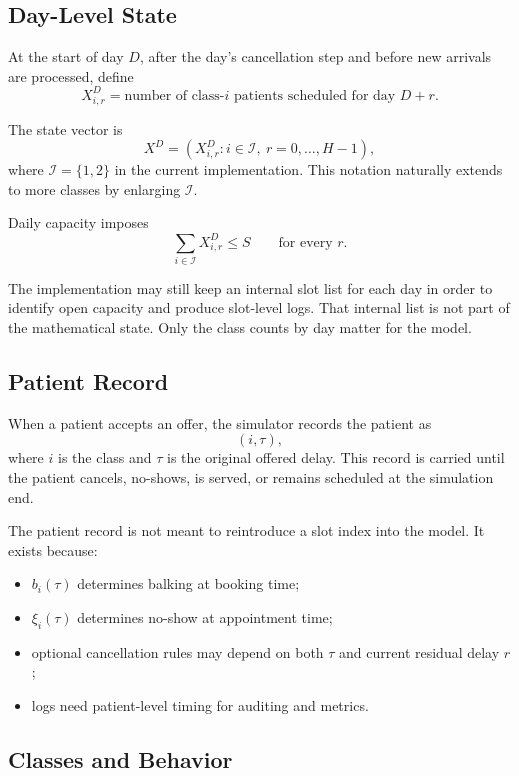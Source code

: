 \documentclass[11pt]{article}
\begin{document}
\subsection{Day-Level State}

At the start of day \(D\), after the day's cancellation step and before new arrivals are processed,
define
\[
X_{i,r}^{D}
=
\text{number of class-}i\text{ patients scheduled for day }D+r.
\]

The state vector is
\[
X^D = \left(X_{i,r}^{D}: i\in\mathcal I,\ r=0,\dots,H-1\right),
\]
where \(\mathcal I=\{1,2\}\) in the current implementation. This notation naturally extends to
more classes by enlarging \(\mathcal I\).

Daily capacity imposes
\[
\sum_{i\in\mathcal I} X_{i,r}^{D} \le S
\qquad
\text{for every }r.
\]

The implementation may still keep an internal slot list for each day in order to identify open
capacity and produce slot-level logs. That internal list is not part of the mathematical state.
Only the class counts by day matter for the model.

\subsection{Patient Record}

When a patient accepts an offer, the simulator records the patient as
\[
(i,\tau),
\]
where \(i\) is the class and \(\tau\) is the original offered delay. This record is carried until
the patient cancels, no-shows, is served, or remains scheduled at the simulation end.

The patient record is not meant to reintroduce a slot index into the model. It exists because:
\begin{itemize}[nosep]
    \item \(b_i(\tau)\) determines balking at booking time;
    \item \(\xi_i(\tau)\) determines no-show at appointment time;
    \item optional cancellation rules may depend on both \(\tau\) and current residual delay \(r\);
    \item logs need patient-level timing for auditing and metrics.
\end{itemize}

\subsection{Classes and Behavior}
\end{document}

